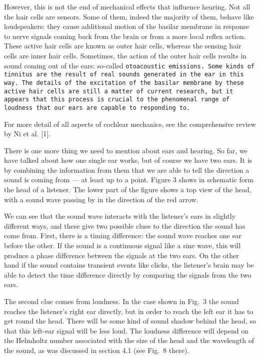   However, this is not the end of mechanical effects that influence hearing. 
  Not all the hair cells are sensors. Some of them, indeed the majority of 
  them, behave like loudspeakers: they cause additional motion of the basilar 
  membrane in response to nerve signals coming back from the brain or from a 
  more local reflex action. These active hair cells are known as outer hair 
  cells, whereas the sensing hair cells are inner hair cells. Sometimes, the 
  action of the outer hair cells results in sound coming out of the ears: 
  so-called \tt{}otoacoustic emissions\rm{}. Some kinds of tinnitus are the 
  result of real sounds generated in the ear in this way. The details of the 
  excitation of the basilar membrane by these active hair cells are still a 
  matter of current research, but it appears that this process is crucial to 
  the phenomenal range of loudness that our ears are capable to responding to. 

  For more detail of all aspects of cochlear mechanics, see the comprehensive 
  review by Ni et al. [1]. 

  There is one more thing we need to mention about ears and hearing. So far, we 
  have talked about how one single ear works, but of course we have two ears. 
  It is by combining the information from them that we are able to tell the 
  direction a sound is coming from — at least up to a point. Figure 3 shows in 
  schematic form the head of a listener. The lower part of the figure shows a 
  top view of the head, with a sound wave passing by in the direction of the 
  red arrow. 


  We can see that the sound wave interacts with the listener’s ears in slightly 
  different ways, and these give two possible clues to the direction the sound 
  has come from. First, there is a timing difference: the sound wave reaches 
  one ear before the other. If the sound is a continuous signal like a sine 
  wave, this will produce a phase difference between the signals at the two 
  ears. On the other hand if the sound contains transient events like clicks, 
  the listener’s brain may be able to detect the time difference directly by 
  comparing the signals from the two ears. 

  The second clue comes from loudness. In the case shown in Fig.\ 3 the sound 
  reaches the listener’s right ear directly, but in order to reach the left ear 
  it has to get round the head. There will be some kind of sound shadow behind 
  the head, so that this left-ear signal will be less loud. The loudness 
  difference will depend on the Helmholtz number associated with the size of 
  the head and the wavelength of the sound, as was discussed in section 4.1 
  (see Fig.\ 8 there). 

